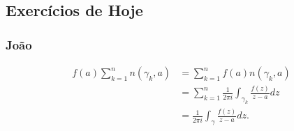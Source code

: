 \documentclass{article}
\begin{document}
  \subsection{Exerc\'icios de Hoje}
  \subsubsection{Jo\~ao}
  \begin{align*}
    f(a)\sum\limits_{k=1}^{n}n(\gamma_{k}, a) &= \sum\limits_{k=1}^{n}f(a)n(\gamma_{k}, a) \\
                                              &= \sum\limits_{k=1}^{n}\frac{1}{2\pi i}\int_{\gamma_{k}}^{}\frac{f(z)}{z-a}dz \\
                                              &= \frac{1}{2\pi i}\int_{\gamma}^{}\frac{f(z)}{z-a}dz.
  \end{align*}
\end{document}
